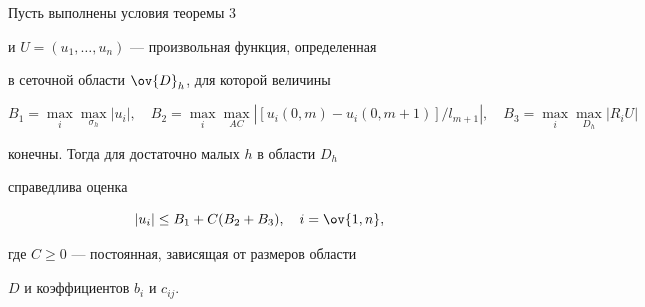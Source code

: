 \begin{cor}


Пусть выполнены условия теоремы 3


и $U=(u_1,\dotsc,u_n)$ --- произвольная функция, определенная


в сеточной области $\ov{D}_h$, для которой величины


$$


B_1 = \max_i \max_{\sigma_h} |u_i|, \quad


B_2 = \max_i \max_{AC} | [u_i(0,m) -


u_i(0,m+1) ]/l_{m+1}|,


\quad B_3=\max_i \max_{D_h} |R_iU|


$$


конечны. Тогда для достаточно малых $h$ в области $D_h$


справедлива оценка


\begin{equation}\label{14}


|u_i| \leq B_1 + C(B_2 + B_3), \quad i=\ov{1,n},


\end{equation}


где $C \geq 0$ --- постоянная, зависящая от размеров области


$D$ и коэффициентов $b_i$ и $c_{ij}$.


\end{cor}









